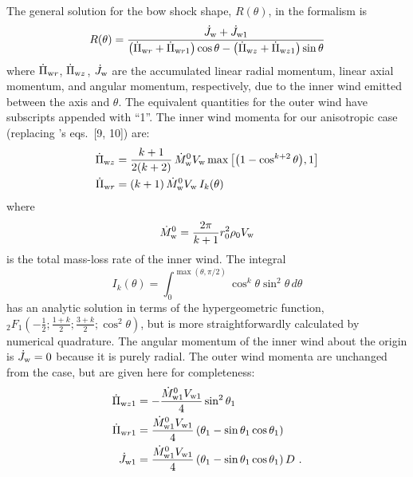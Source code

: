 The general solution for the bow shock shape, \(R(\theta)\), in the \CRW{}
formalism is
\begin{equation}
  R(\theta) = \frac {\dot{J}_{\mathrm{w}} + \dot{J}_{\mathrm{w}{}1}}
  {\left(\dot{\Pi}_{\mathrm{w}{}r}+\dot{\Pi}_{\mathrm{w}{}r1}\right)\cos\theta
    - \left(\dot{\Pi}_{\mathrm{w}{}z}+\dot{\Pi}_{\mathrm{w}{}z1}\right)\sin\theta}
  \label{eq:Rmom}
\end{equation}
where \(\dot{\Pi}_{\mathrm{w}{}r}\), \(\dot{\Pi}_{\mathrm{w}{}z}\), \(\dot{J}_{\mathrm{w}}\) are
the accumulated linear radial momentum, linear axial momentum, and
angular momentum, respectively, due to the inner wind emitted between
the axis and \(\theta\). The equivalent quantities for the outer wind have
subscripts appended with ``1''.  The inner wind momenta for our
anisotropic case (replacing \CRW{}'s eqs.~[9, 10]) are:
\begin{gather}
  \label{eq:ancantoid-momenta}
  \begin{aligned}
    \dot{\Pi}_{\mathrm{w}{}z} &= \frac{k + 1}{2(k+2)}\, \dot{M}_{\mathrm{w}}^0 V_{\mathrm{w}}
    \max\left[\bigl(1- \cos^{k+2} \theta\bigr), 1 \right] \\
    \dot{\Pi}_{\mathrm{w}{}r} &= (k + 1)\, \dot{M}^0_{\mathrm{w}} V_{\mathrm{w}}\, I_k (\theta) 
  \end{aligned}
\end{gather}
where
\begin{equation}
  \label{eq:ancantoid-mass-loss}
  \dot{M}^0_{\mathrm{w}} = \frac{2 \pi} {k + 1} r_0^2 \rho_0 V_{\mathrm{w}}
\end{equation}
is the total mass-loss rate of the inner wind. The integral
\begin{equation}
  \label{eq:ancantoid-I-integral}
  I_k(\theta) = \int^{\max(\theta, \pi/2)}_0 \cos^k \theta \sin^2\theta \,d\theta 
\end{equation}
has an analytic solution in terms of the hypergeometric function,
\({}_2 F_1(-\tfrac12; \tfrac{1+k}2; \tfrac{3+k}2; \cos^2 \theta)\), but is
more straightforwardly calculated by numerical quadrature.  The
angular momentum of the inner wind about the origin is
\(\dot{J}_{\mathrm{w}} = 0\) because it is purely radial.  The outer wind
momenta are unchanged from the \CRW{} case, but are given here for
completeness:
\begin{gather}
  \label{eq:ancantoid-momenta-outer}
  \begin{aligned}
    \dot{\Pi}_{\mathrm{w}{}z1} & =
    -\frac{\dot{M}^0_{\mathrm{w}{}1}V_{\mathrm{w}{}1}}{4}\sin^2\theta_1\\
    \dot{\Pi}_{\mathrm{w}{}r1} & =
    \frac{\dot{M}^0_{\mathrm{w}{}1}V_{\mathrm{w}{}1}}{4}\left(\theta_1-\sin\theta_1\cos\theta_1\right)\\
    \dot{J}_{\mathrm{w}{}1} & =
    \frac{\dot{M}^0_{\mathrm{w}{}1}V_{\mathrm{w}{}1}}{4}\left(\theta_1-\sin\theta_1\cos\theta_1\right)D \ .
  \end{aligned} 
\end{gather}

